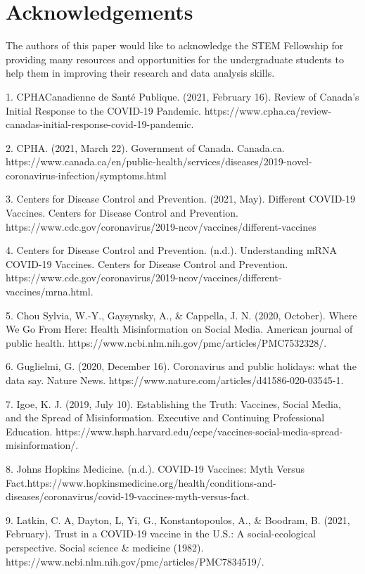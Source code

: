 \documentclass[10pt,twocolumn,letterpaper]{article}
\begin{document}
\section*{Acknowledgements}
The authors of this paper would like to acknowledge the STEM Fellowship for providing many resources and opportunities for the undergraduate students to help them in improving their research and data analysis skills. 


1. CPHACanadienne de Santé Publique. (2021, February 16). Review of Canada's Initial Response to the COVID-19 Pandemic.     https://www.cpha.ca/review-canadas-initial-response-covid-19-pandemic. 

2. CPHA. (2021, March 22). Government of Canada. Canada.ca. https://www.canada.ca/en/public-health/services/diseases/2019-novel-coronavirus-infection/symptoms.html

3. Centers for Disease Control and Prevention. (2021, May). Different COVID-19 Vaccines. Centers for Disease Control and Prevention.    https://www.cdc.gov/coronavirus/2019-ncov/vaccines/different-vaccines 

4. Centers for Disease Control and Prevention. (n.d.). Understanding mRNA COVID-19 Vaccines. Centers for Disease Control and Prevention. https://www.cdc.gov/coronavirus/2019-ncov/vaccines/different-vaccines/mrna.html.

5. Chou Sylvia, W.-Y., Gaysynsky, A., & Cappella, J. N. (2020, October). Where We Go From Here: Health Misinformation on Social Media. American journal of public health. https://www.ncbi.nlm.nih.gov/pmc/articles/PMC7532328/.  

6. Guglielmi, G. (2020, December 16). Coronavirus and public holidays: what the data say. Nature News. https://www.nature.com/articles/d41586-020-03545-1. 

7. Igoe, K. J. (2019, July 10). Establishing the Truth: Vaccines, Social Media, and the Spread of Misinformation. Executive and Continuing Professional Education. https://www.hsph.harvard.edu/ecpe/vaccines-social-media-spread-misinformation/.   

8. Johns Hopkins Medicine. (n.d.). COVID-19 Vaccines: Myth Versus Fact.https://www.hopkinsmedicine.org/health/conditions-and-diseases/coronavirus/covid-19-vaccines-myth-versus-fact. 

9. Latkin, C. A, Dayton, L, Yi, G., Konstantopoulos, A., & Boodram, B. (2021, February). Trust in a COVID-19 vaccine in the U.S.: A social-ecological perspective. Social science & medicine (1982). https://www.ncbi.nlm.nih.gov/pmc/articles/PMC7834519/. 
\end{document}
